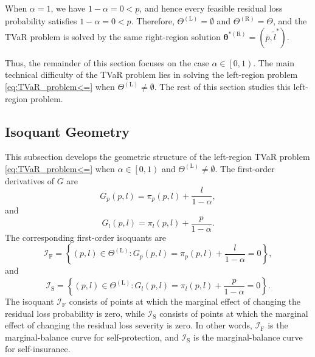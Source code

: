 \documentclass[a4paper,12pt]{article}
\begin{document}
When $\alpha=1$, we have $1-\alpha=0<\underline{p}$, and hence every feasible residual loss probability satisfies $1-\alpha=0<p$. Therefore, $\Theta^{\left(\text{L}\right)}=\emptyset$ and $\Theta^{\left(\text{R}\right)}=\Theta$, and the TVaR problem is solved by the same right-region solution ${\bm\theta}^{*\left(\text{R}\right)}=\left(\overline{p},\tilde{l}^*\right)$.

Thus, the remainder of this section focuses on the case $\alpha\in\left[0,1\right)$. The main technical difficulty of the TVaR problem lies in solving the left-region problem \eqref{eq:TVaR_problem<=} when $\Theta^{\left(\text{L}\right)}\neq\emptyset$. The rest of this section studies this left-region problem.

\subsection{Isoquant Geometry}\label{sec:iso_geo}

This subsection develops the geometric structure of the left-region TVaR problem \eqref{eq:TVaR_problem<=} when $\alpha\in\left[0,1\right)$ and $\Theta^{\left(\text{L}\right)}\neq\emptyset$. The first-order derivatives of $G$ are
\begin{equation*}
G_p\left(p,l\right)=\pi_p\left(p,l\right)+\frac{l}{1-\alpha},
\end{equation*}
and
\begin{equation*}
G_l\left(p,l\right)=\pi_l\left(p,l\right)+\frac{p}{1-\alpha}.
\end{equation*}
The corresponding first-order isoquants are
\begin{equation*}
\mathcal{I}_{\text{F}}=\left\{\left(p,l\right)\in\Theta^{\left(\text{L}\right)}:G_p\left(p,l\right)=\pi_p\left(p,l\right)+\frac{l}{1-\alpha}=0\right\},
\end{equation*}
and
\begin{equation*}
\mathcal{I}_{\text{S}}=\left\{\left(p,l\right)\in\Theta^{\left(\text{L}\right)}:G_l\left(p,l\right)=\pi_l\left(p,l\right)+\frac{p}{1-\alpha}=0\right\}.
\end{equation*}
The isoquant $\mathcal{I}_{\text{F}}$ consists of points at which the marginal effect of changing the residual loss probability is zero, while $\mathcal{I}_{\text{S}}$ consists of points at which the marginal effect of changing the residual loss severity is zero. In other words, $\mathcal{I}_{\text{F}}$ is the marginal-balance curve for self-protection, and $\mathcal{I}_{\text{S}}$ is the marginal-balance curve for self-insurance.
\end{document}
